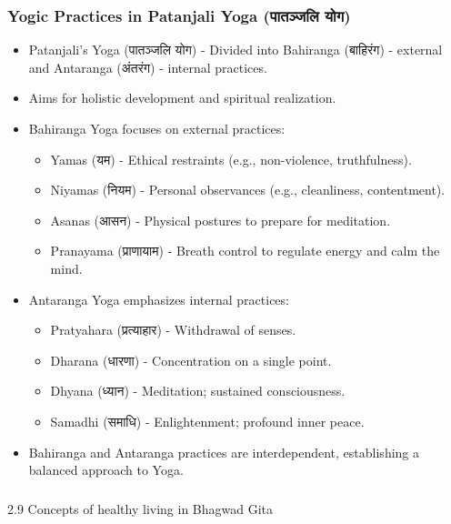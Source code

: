 
\begin{frame}[fragile]\frametitle{Yogic Practices in Patanjali Yoga (पातञ्जलि योग)}

      \begin{itemize}
		\item Patanjali’s Yoga (पातञ्जलि योग) - Divided into Bahiranga (बाहिरंग) - external and Antaranga (अंतरंग) - internal practices.
		\item Aims for holistic development and spiritual realization.
		\item Bahiranga Yoga focuses on external practices:
		  \begin{itemize}
		      \item Yamas (यम) - Ethical restraints (e.g., non-violence, truthfulness).
		      \item Niyamas (नियम) - Personal observances (e.g., cleanliness, contentment).
		      \item Asanas (आसन) - Physical postures to prepare for meditation.
		      \item Pranayama (प्राणायाम) - Breath control to regulate energy and calm the mind.
		  \end{itemize}
		\item Antaranga Yoga emphasizes internal practices:
		  \begin{itemize}
		      \item Pratyahara (प्रत्याहार) - Withdrawal of senses.
		      \item Dharana (धारणा) - Concentration on a single point.
		      \item Dhyana (ध्यान) - Meditation; sustained consciousness.
		      \item Samadhi (समाधि) - Enlightenment; profound inner peace.
		  \end{itemize}
		\item Bahiranga and Antaranga practices are interdependent, establishing a balanced approach to Yoga.
	  \end{itemize}

\end{frame}


\begin{frame}[fragile]\frametitle{}
\begin{center}
{\Large 2.9  Concepts of healthy living in Bhagwad Gita}
\end{center}
\end{frame}


